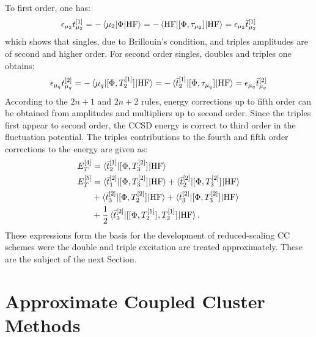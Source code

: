 To first order, one has:
\begin{equation}\label{eq:1st-order}
  \epsilon_{\mu_2}t_{\mu_2}^{[1]}
  = - \braket{\mu_2 | \Phi | \mathrm{HF}}
  = - \braket{\mathrm{HF} | [ \Phi, \tau_{\mu_2} ]^{} |
  \mathrm{HF}}
  = \epsilon_{\mu_2}\bar{t}_{\mu_2}^{[1]}
\end{equation}
which shows that singles, due to Brillouin's condition, and triples
amplitudes are of second and higher order.
For second order singles, doubles and triples one obtains:
\begin{equation}\label{eq:2nd-order}
  \epsilon_{\mu_q}t_{\mu_q}^{[2]}
  = - \braket{\mu_q | [ \Phi, T_2^{[1]} ]^{} | \mathrm{HF}}
  = - \braket{\bar{t}_{2}^{[1]} | [ \Phi, \tau_{\mu_q} ]^{} |
  \mathrm{HF}}
  = \epsilon_{\mu_q}\bar{t}_{\mu_q}^{[2]}
\end{equation}
According to the $2n+1$ and $2n+2$ rules, energy corrections up to fifth
order can be obtained from amplitudes and multipliers up to second
order. Since the triples first appear to second order, the \gls{CCSD}
energy is correct to third order in the fluctuation potential.
The triples contributions to the fourth and fifth order corrections to
the energy are given as:
\begin{subequations}
  \begin{align}
    E_T^{[4]} &=
 \braket{\bar{t}_{2}^{[1]}| [ \Phi, T_3^{[2]} ]^{} | \mathrm{HF}}
 \label{eq:4th-order-triples} \\
    E_T^{[5]} &=
    \braket{\bar{t}_{1}^{[2]} | [ \Phi, T_3^{[2]} ]^{} | \mathrm{HF}}
  + \braket{\bar{t}_{2}^{[2]} | [ \Phi, T_3^{[2]} ]^{} | \mathrm{HF}}
  \nonumber \\
  &+ \braket{\bar{t}_{3}^{[2]} | [ \Phi, T_2^{[2]} ]^{} | \mathrm{HF}}
  + \braket{\bar{t}_{3}^{[2]} | [ \Phi, T_3^{[2]} ]^{} | \mathrm{HF}}
  \nonumber \\
    &+
    \frac{1}{2}\braket{\bar{t}_{3}^{[2]} |
    [ [ \Phi, T_2^{[1]} ]^{}, T_2^{[1]} ]^{}
    | \mathrm{HF}}.
 \label{eq:5th-order-triples}
  \end{align}
\end{subequations}
These expressions form the basis for the development of reduced-scaling
\acrshort*{CC} schemes were the double and triple excitation are treated
approximately. These are the subject of the next Section.

\section{Approximate Coupled Cluster Methods}\label{sec:cc-approximate}

